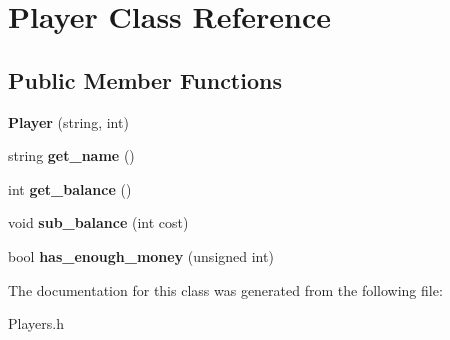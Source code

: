 \hypertarget{class_player}{\section{Player Class Reference}
\label{class_player}
}
\subsection*{Public Member Functions}
\begin{DoxyCompactItemize}
\item 
\hypertarget{class_player_aaf1dcc6f6b07ba59fbbeb89f926cd0da}{{\bfseries Player} (string, int)}\label{class_player_aaf1dcc6f6b07ba59fbbeb89f926cd0da}

\item 
\hypertarget{class_player_afca8141f38b60b526fd2f874523a2726}{string {\bfseries get\-\_\-name} ()}\label{class_player_afca8141f38b60b526fd2f874523a2726}

\item 
\hypertarget{class_player_aec2430eb4f755d97e4a314f425e2d675}{int {\bfseries get\-\_\-balance} ()}\label{class_player_aec2430eb4f755d97e4a314f425e2d675}

\item 
\hypertarget{class_player_af0435bc3b2479970baa6e68b357413fe}{void {\bfseries sub\-\_\-balance} (int cost)}\label{class_player_af0435bc3b2479970baa6e68b357413fe}

\item 
\hypertarget{class_player_a93a82d102daa721442afb04d3e15bf94}{bool {\bfseries has\-\_\-enough\-\_\-money} (unsigned int)}\label{class_player_a93a82d102daa721442afb04d3e15bf94}

\end{DoxyCompactItemize}


The documentation for this class was generated from the following file\-:\begin{DoxyCompactItemize}
\item 
Players.\-h\end{DoxyCompactItemize}
